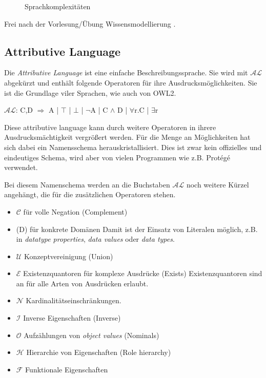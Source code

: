\begin{figure}[htb]
	\caption{Sprachkomplexitäten}
	\label{image-sprachhierarchie}
	\begin{center}
	\end{center}
\end{figure}
Frei nach der Vorlesung/Übung Wissensmodellierung \cite{vonHenke2009}.

\subsection{Attributive Language}
Die \emph{Attributive Language} ist eine einfache Beschreibungssprache. Sie wird mit $\mathcal{AL}$ abgekürzt und enthält folgende Operatoren für ihre Ausdrucksmöglichkeiten. Sie ist die Grundlage viler Sprachen, wie auch von OWL2.

$\mathcal{AL}$: C,D $\Longrightarrow$ A | $\top$ | $\bot$ | $\lnot$A | C $\land$ D | $\forall$r.C | $\exists$r

Diese attributive language kann durch weitere Operatoren in ihrere Ausdrucksmächtigkeit vergrößert werden. Für die Menge an Möglichkeiten hat sich dabei ein Namensschema herauskristallisiert. Dies ist zwar kein offizielles und eindeutiges Schema, wird aber von vielen Programmen wie z.B. Protégé verwendet.

Bei diesem Namenschema werden an die Buchstaben $\mathcal{AL}$ noch weitere Kürzel angehängt, die für die zusätzlichen Operatoren stehen.
\begin{itemize}
  \item $\mathcal{C}$ für volle Negation (Complement)
  \item (D) für konkrete Domänen\newline
Damit ist der Einsatz von Literalen möglich, z.B. in \emph{datatype properties}, \emph{data values} oder \emph{data types}.
  \item $\mathcal{U}$ Konzeptvereinigung (Union)
  \item $\mathcal{E}$ Existenzquantoren für komplexe Ausdrücke (Exists)\newline
Existenzquantoren sind an für alle Arten von Ausdrücken erlaubt.
  \item $\mathcal{N}$ Kardinalitätseinschränkungen.
  \item $\mathcal{I}$ Inverse Eigenschaften (Inverse)
  \item $\mathcal{O}$ Aufzählungen von \emph{object values} (Nominals)
  \item $\mathcal{H}$ Hierarchie von Eigenschaften (Role hierarchy)
  \item $\mathcal{F}$ Funktionale Eigenschaften
\end{itemize}
\cite{wiki:DescriptionLogic}

